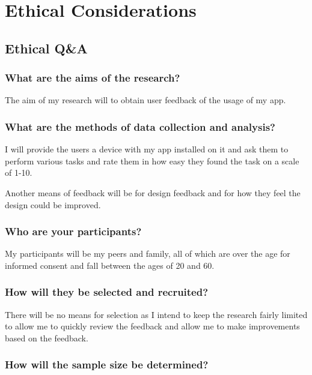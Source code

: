 \section{Ethical Considerations}\label{ethical-considerations}

\subsection{Ethical Q\&A}\label{ethical-qa}

\subsubsection{What are the aims of the
research?}\label{what-are-the-aims-of-the-research}

The aim of my research will to obtain user feedback of the usage of my
app.

\subsubsection{What are the methods of data collection and
analysis?}\label{what-are-the-methods-of-data-collection-and-analysis}

I will provide the users a device with my app installed on it and ask
them to perform various tasks and rate them in how easy they found the
task on a scale of 1-10.

Another means of feedback will be for design feedback and for how they
feel the design could be improved.

\subsubsection{Who are your
participants?}\label{who-are-your-participants}

My participants will be my peers and family, all of which are over the
age for informed consent and fall between the ages of 20 and 60.

\subsubsection{How will they be selected and
recruited?}\label{how-will-they-be-selected-and-recruited}

There will be no means for selection as I intend to keep the research
fairly limited to allow me to quickly review the feedback and allow me
to make improvements based on the feedback.

\subsubsection{How will the sample size be
determined?}\label{how-will-the-sample-size-be-determined}


